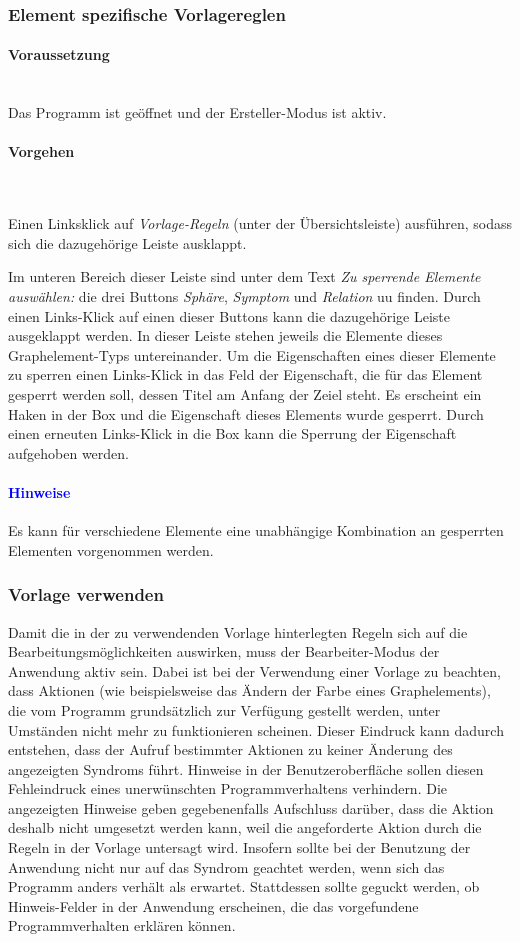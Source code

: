 \documentclass[enabledeprecatedfontcommands,fontsize=11pt,paper=a4,twoside]{scrartcl}
\newcounter{one}
\newcounter{two}[one]
\newcommand*{\hint}{\paragraph{\textcolor{blue}{Hinweise}}}
\newcommand*{\condition}{\paragraph{Voraussetzung}$\;$ \vspace{0.2cm}\\}
\newcommand*{\actions}{\paragraph{Vorgehen} $\;$\vspace{0.2cm}\\}
\let\tempone\itemize
\let\temptwo\enditemize
\renewenvironment{itemize}{\tempone\addtolength{\itemsep}{-10.0pt}}{\temptwo}
\let\origenumerate\enumerate
\let\origendenumerate\endenumerate
\renewenvironment{enumerate}{\origenumerate \addtolength{\itemsep}{-10.0pt}}{\origendenumerate}
\begin{document}
\subsubsection{Element spezifische Vorlagereglen}
\condition 
Das Programm ist geöffnet und der Ersteller-Modus ist aktiv.
\actions
\begin{enumerate}
\item Einen Linksklick auf \textit{Vorlage-Regeln} (unter der Übersichtsleiste) ausführen, sodass sich die dazugehörige Leiste ausklappt.
\item Im unteren Bereich dieser Leiste sind unter dem Text \textit{Zu sperrende Elemente auswählen:} die drei Buttons \textit{Sphäre}, \textit{Symptom} und \textit{Relation} uu finden. Durch einen Links-Klick auf einen dieser Buttons kann die dazugehörige Leiste ausgeklappt werden. In dieser Leiste stehen jeweils die Elemente dieses Graphelement-Typs untereinander. Um die Eigenschaften eines dieser Elemente zu sperren einen Links-Klick in das Feld der Eigenschaft, die für das Element gesperrt werden soll, dessen Titel am Anfang der Zeiel steht. Es erscheint ein Haken in der Box und die Eigenschaft dieses Elements wurde gesperrt. Durch einen erneuten Links-Klick in die Box kann die Sperrung der Eigenschaft aufgehoben werden.
\end{enumerate} 
\hint
\begin{itemize}
\item Es kann für verschiedene Elemente eine unabhängige Kombination an gesperrten Elementen vorgenommen werden.
\end{itemize} 
\newpage
\subsubsection{Vorlage verwenden}
Damit die in der zu verwendenden Vorlage hinterlegten Regeln sich auf die Bearbeitungsmöglichkeiten auswirken, muss der Bearbeiter-Modus der Anwendung aktiv sein.
Dabei ist bei der Verwendung einer Vorlage zu beachten, dass Aktionen (wie beispielsweise das Ändern der Farbe eines Graphelements), die vom Programm grundsätzlich zur Verfügung gestellt werden, unter Umständen nicht mehr zu funktionieren scheinen. Dieser Eindruck kann dadurch entstehen, dass der Aufruf bestimmter Aktionen zu keiner Änderung des angezeigten Syndroms führt. Hinweise in der Benutzeroberfläche sollen diesen Fehleindruck eines unerwünschten Programmverhaltens verhindern. Die angezeigten Hinweise geben gegebenenfalls Aufschluss darüber, dass die Aktion deshalb nicht umgesetzt werden kann, weil die angeforderte Aktion durch die Regeln in der Vorlage untersagt wird. Insofern sollte bei der Benutzung der Anwendung nicht nur auf das Syndrom geachtet werden, wenn sich das Programm anders verhält als erwartet. Stattdessen sollte geguckt werden, ob Hinweis-Felder in der Anwendung erscheinen, die das vorgefundene Programmverhalten erklären können. 
\newpage
\end{document}
